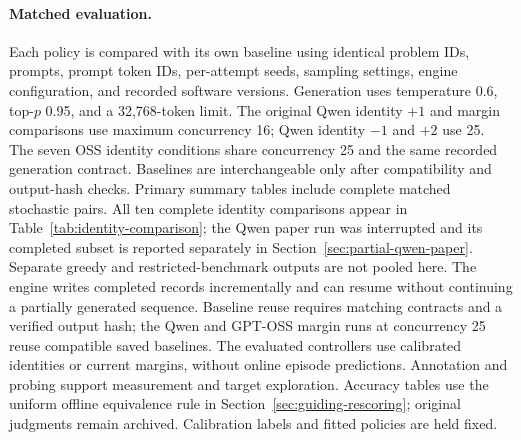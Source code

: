 \paragraph{Matched evaluation.}
Each policy is compared with its own baseline using identical problem IDs,
prompts, prompt token IDs, per-attempt seeds, sampling settings, engine
configuration, and recorded software versions. Generation uses temperature
0.6, top-$p$ 0.95, and a 32,768-token limit. The original Qwen identity $+1$ and margin
comparisons use maximum concurrency 16; Qwen identity $-1$ and $+2$
use 25. The seven OSS identity conditions share concurrency 25 and the
same recorded generation contract. Baselines are interchangeable only
after compatibility and output-hash checks. Primary summary tables include
complete matched stochastic pairs. All ten complete identity comparisons
appear in Table~\ref{tab:identity-comparison}; the Qwen paper run was interrupted and its completed subset is reported
separately in Section~\ref{sec:partial-qwen-paper}.
Separate greedy and restricted-benchmark outputs are not pooled here.
The engine writes completed records incrementally and can resume without
continuing a partially generated sequence. Baseline reuse requires matching
contracts and a verified output hash; the Qwen and GPT-OSS margin runs at
concurrency 25 reuse compatible saved baselines. The evaluated controllers
use calibrated identities or current margins, without online episode
predictions. Annotation and probing support measurement and target exploration.
Accuracy tables use the uniform offline equivalence rule in
Section~\ref{sec:guiding-rescoring}; original judgments remain archived.
Calibration labels and fitted policies are held fixed.






